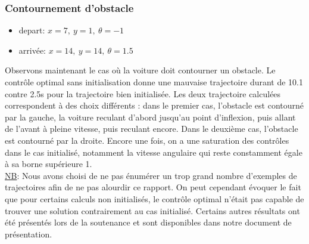 \documentclass[a4paper,12pt]{report}
\newcommand{\itemo}{\item[\textsf{o}]}
\begin{document}
\subsubsection{Contournement d'obstacle}
\begin{itemize}
	\itemo depart: $x=7,\ y=1,\ \theta=-1$
	\itemo arrivée: $x=14,\ y=14,\ \theta=1.5$
\end{itemize}
\vspace{0.4cm}

Observons maintenant le cas où la voiture doit contourner un obstacle. Le contrôle optimal sans initialisation donne une mauvaise trajectoire durant de 10.1 contre 2.5s pour la trajectoire bien initialisée. Les deux trajectoire calculées correspondent à des choix différents : dans le premier cas, l'obstacle est contourné par la gauche, la voiture reculant d'abord jusqu'au point d'inflexion, puis allant de l'avant à pleine vitesse, puis reculant encore. Dans le deuxième cas, l'obstacle est contourné par la droite. Encore une fois, on a une saturation des contrôles dans le cas initialisé, notamment la vitesse angulaire qui reste constamment égale à sa borne supérieure 1. \\



{\underline{NB}}: Nous avons choisi de ne pas énumérer un trop grand nombre d'exemples de trajectoires afin de ne pas alourdir ce rapport. On peut cependant évoquer le fait que pour certains calculs non initialisés, le contrôle optimal n'était pas capable de trouver une solution contrairement au cas initialisé. Certains autres résultats ont été présentés lors de la soutenance et sont disponibles dans notre document de présentation.
\end{document}
